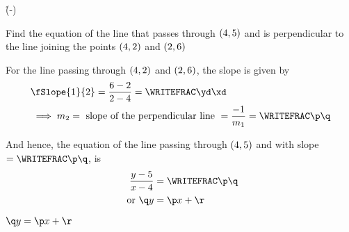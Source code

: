 


\SUBTRACT\vd\vb\yd
\SUBTRACT\vc\va\xd
{}\yd\xd\p\q
\EXPR[0]\r{(\q*\vf-\p*\ve)}

\question[2] Find the equation of the line that passes through $(4,5)$ and 
is perpendicular to the line joining the points $(4,2)$ and $(2, 6)$

\watchout

\begin{solution}[\halfpage]
	For the line passing through $(4, 2)$ and $(2, 6)$, the slope is given by 
	\begin{align}
		& \fSlope{1}{2} = \dfrac{\vd - \vb}{\vc - \va} = \WRITEFRAC\yd\xd \\
		& \implies m_2 = \text{ slope of the perpendicular line } = \dfrac{-1}{m_1} = \WRITEFRAC\p\q
	\end{align}
	
	And hence, the equation of the line passing through $(4,5)$ and with slope $= \WRITEFRAC\p\q$, is
	\begin{align}
		\dfrac{y-\vf}{x-\ve} &= \WRITEFRAC\p\q \\
		\text{ or } \q y &= \p x + \r 
	\end{align}
\end{solution}

\ifprintanswers
  \begin{codex}
    $\q y = \p x + \r$
  \end{codex}
\fi
